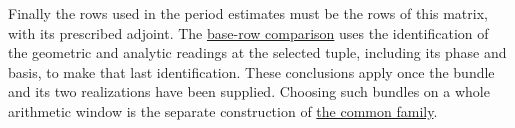 Finally the rows used in the period estimates must be the rows of this
matrix, with its prescribed adjoint. The
\hyperref[ms-manuscript-notes-construction-selected-base-rows-md]{base-row comparison}
uses the identification of the geometric and analytic readings at the
selected tuple, including its phase and basis, to make that last
identification. These conclusions apply once the bundle and its two
realizations have been supplied. Choosing such bundles on a whole
arithmetic window is the separate construction of
\hyperref[ms-manuscript-notes-arithmetic-common-design-window-transfer-md]{the common family}.
